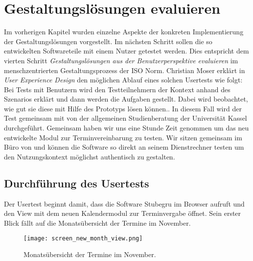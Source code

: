 \chapter{Gestaltungslösungen evaluieren}
\label{chapter:evaluation}

Im vorherigen Kapitel wurden einzelne Aspekte der konkreten Implementierung der
Gestaltungslösungen vorgestellt. Im nächsten Schritt sollen die so entwickelten
Softwareteile mit einem Nutzer getestet werden. Dies entspricht dem vierten
Schritt \textit{Gestaltungslösungen aus der Benutzerperspektive evaluieren} im
menschzentrierten Gestaltungsprozess der ISO Norm\cite{ISO9241}. Christian
Moser erklärt in \textit{User Experience Design} den möglichen Ablauf eines
solchen Usertests wie folgt: \glqq{}Bei Tests mit Benutzern wird den
Testteilnehmern der Kontext anhand des Szenarios erklärt und dann werden die
Aufgaben gestellt. Dabei wird beobachtet, wie gut sie diese mit Hilfe des
Prototyps lösen können.\grqq{}\cite{moserTesting}. In diesem Fall wird der Test
gemeinsam mit \ipName von der allgemeinen Studienberatung der Universität
Kassel durchgeführt. Gemeinsam haben wir uns eine Stunde Zeit genommen um das
neu entwickelte Modul zur Terminvereinbarung zu testen. Wir sitzen gemeinsam im
Büro von \ipName und können die Software so direkt an seinem Dienstrechner
testen um den Nutzungskontext möglichst authentisch zu gestalten.

\section{Durchführung des Usertests}

Der Usertest beginnt damit, dass \ipName die Software Stubegru im Browser
aufruft und den View mit dem neuen Kalendermodul zur Terminvergabe öffnet. Sein
erster Blick fällt auf die Monatsübersicht der Termine im November.

\begin{figure}[H]
    \caption{Monatsübersicht der Termine im November.}
    \centering
    \texttt{[image: screen\_new\_month\_view.png]}
\end{figure}

